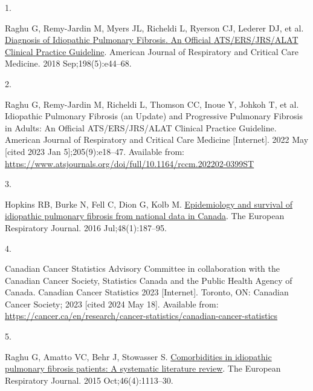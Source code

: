 \documentclass[
]{article}
\newlength{\cslhangindent}
\newlength{\csllabelwidth}
\newlength{\cslentryspacingunit} %
\newenvironment{CSLReferences}[2] %
 {%
  \setlength{\parindent}{0pt}
  \ifodd #1
  \let\oldpar\par
  \def\par{\hangindent=\cslhangindent\oldpar}
  \fi
  \setlength{\parskip}{#2\cslentryspacingunit}
 }%
 {}
\newcommand{\CSLLeftMargin}[1]{\parbox[t]{\csllabelwidth}{#1}}
\newcommand{\CSLRightInline}[1]{\parbox[t]{\linewidth - \csllabelwidth}{#1}\break}
\begin{document}
\hypertarget{refs}{}
\begin{CSLReferences}{0}{0}
\leavevmode{}%
\CSLLeftMargin{1. }%
\CSLRightInline{Raghu G, Remy-Jardin M, Myers JL, Richeldi L, Ryerson CJ, Lederer DJ, et al. \href{https://doi.org/10.1164/rccm.201807-1255ST}{Diagnosis of {Idiopathic} {Pulmonary} {Fibrosis}. {An} {Official} {ATS}/{ERS}/{JRS}/{ALAT} {Clinical} {Practice} {Guideline}}. American Journal of Respiratory and Critical Care Medicine. 2018 Sep;198(5):e44--68. }

\leavevmode{}%
\CSLLeftMargin{2. }%
\CSLRightInline{Raghu G, Remy-Jardin M, Richeldi L, Thomson CC, Inoue Y, Johkoh T, et al. Idiopathic {Pulmonary} {Fibrosis} (an {Update}) and {Progressive} {Pulmonary} {Fibrosis} in {Adults}: {An} {Official} {ATS}/{ERS}/{JRS}/{ALAT} {Clinical} {Practice} {Guideline}. American Journal of Respiratory and Critical Care Medicine {[}Internet{]}. 2022 May {[}cited 2023 Jan 5{]};205(9):e18--47. Available from: \url{https://www.atsjournals.org/doi/full/10.1164/rccm.202202-0399ST}}

\leavevmode{}%
\CSLLeftMargin{3. }%
\CSLRightInline{Hopkins RB, Burke N, Fell C, Dion G, Kolb M. \href{https://doi.org/10.1183/13993003.01504-2015}{Epidemiology and survival of idiopathic pulmonary fibrosis from national data in {Canada}}. The European Respiratory Journal. 2016 Jul;48(1):187--95. }

\leavevmode{}%
\CSLLeftMargin{4. }%
\CSLRightInline{Canadian Cancer Statistics Advisory Committee in collaboration with the Canadian Cancer Society, Statistics Canada and the Public Health Agency of Canada. Canadian {Cancer} {Statistics} 2023 {[}Internet{]}. Toronto, ON: Canadian Cancer Society; 2023 {[}cited 2024 May 18{]}. Available from: \url{https://cancer.ca/en/research/cancer-statistics/canadian-cancer-statistics}}

\leavevmode{}%
\CSLLeftMargin{5. }%
\CSLRightInline{Raghu G, Amatto VC, Behr J, Stowasser S. \href{https://doi.org/10.1183/13993003.02316-2014}{Comorbidities in idiopathic pulmonary fibrosis patients: A systematic literature review}. The European Respiratory Journal. 2015 Oct;46(4):1113--30. }


\end{CSLReferences}
\end{document}

